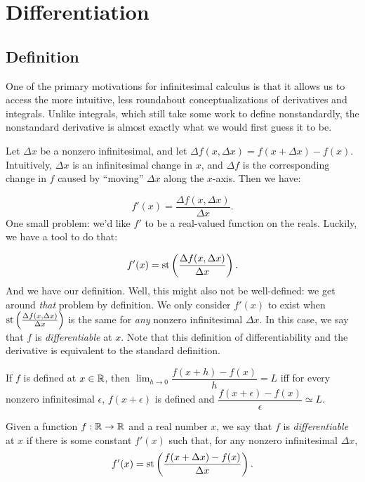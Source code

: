 \section{Differentiation}
\subsection{Definition}
One of the primary motivations for infinitesimal calculus is that it allows us to access the more intuitive, less roundabout conceptualizations of derivatives and integrals. Unlike integrals, which still take some work to define nonstandardly, the nonstandard derivative is almost exactly what we would first guess it to be.

Let $\Delta x$ be a nonzero infinitesimal, and let $\Delta f (x, \Delta x) = f(x + \Delta x) - f(x)$. Intuitively, $\Delta x$ is an infinitesimal change in $x$, and $\Delta f$ is the corresponding change in $f$ caused by ``moving'' $\Delta x$ along the $x$-axis. Then we have:

\[ f'(x) = \frac{\Delta f(x, \Delta x)}{\Delta x}. \]
One small problem: we'd like $f'$ to be a real-valued function on the reals. Luckily, we have a tool to do that:

\[ f'(x) = \operatorname{st}\left(\frac{\Delta f(x, \Delta x)}{\Delta x}\right). \]
And we have our definition. Well, this might also not be well-defined: we get around \textit{that} problem by definition. We only consider $f'(x)$ to exist when $\operatorname{st}\left(\frac{\Delta f(x, \Delta x)}{\Delta x}\right)$ is the same for \textit{any} nonzero infinitesimal $\Delta x$. In this case, we say that $f$ is \textit{differentiable} at $x$. Note that this definition of differentiability and the derivative is equivalent to the standard definition.

\begin{thm}\label{nonStandardDerivEquivalent}
    If $f$ is defined at $x \in \mathbb{R}$, then $\displaystyle{\lim_{h\to 0}} \dfrac{f(x + h) - f(x)}{h} = L$ iff for every nonzero infinitesimal $\epsilon$, $f(x + \epsilon)$ is defined and $\dfrac{f(x + \epsilon) - f(x)}{\epsilon} \simeq L$.
\end{thm}

\begin{defn}
    Given a function $f: \mathbb{R} \to \mathbb{R}$ and a real number $x$, we say that $f$ is \textit{differentiable} at $x$ if there is some constant $f'(x)$ such that, for any nonzero infinitesimal $\Delta x$,
    \[f'(x) = \operatorname{st}\left(\frac{f(x + \Delta x) - f(x)}{\Delta x}\right).\]
\end{defn}

